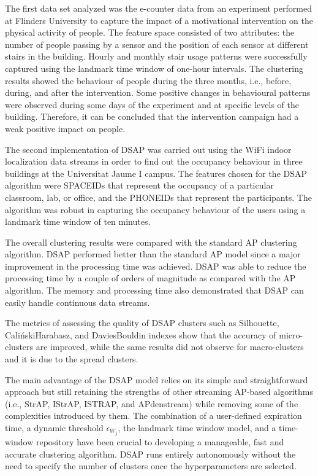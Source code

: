 The first data set analyzed was the e-counter data from an experiment performed at Flinders University to capture the impact of a motivational intervention on the physical activity of people. The feature space consisted of two attributes: the number of people passing by a sensor and the position of each sensor at different stairs in the building. Hourly and monthly stair usage patterns were successfully captured using the landmark time window of one-hour intervals. The clustering results showed the behaviour of people during the three months, i.e., before, during, and after the intervention. Some positive changes in behavioural patterns were observed during some days of the experiment and at specific levels of the building. Therefore, it can be concluded that the intervention campaign had a weak positive impact on people.

The second implementation of DSAP was carried out using the WiFi indoor localization data streams in order to find out the occupancy behaviour in three buildings at the Universitat Jaume I campus. The features chosen for the DSAP algorithm were SPACEIDs that represent the occupancy of a particular classroom, lab, or office, and the PHONEIDs that represent the participants. The algorithm was robust in capturing the occupancy behaviour of the users using a landmark time window of ten minutes. 
 
The overall clustering results were compared with the standard AP clustering algorithm. DSAP performed better than the standard AP model since a major improvement in the processing time was achieved. DSAP was able to reduce the processing time by a couple of orders of magnitude as compared with the AP algorithm. The memory and processing time also demonstrated that DSAP can easily handle continuous data streams.

The metrics of assessing the quality of DSAP clusters such as Silhouette, Caliński\-Harabasz, and Davies\-Bouldin indexes show that the accuracy of micro-clusters are improved, while the same results did not observe for macro-clusters and it is due to the spread clusters.

The main advantage of the DSAP model relies on its simple and straightforward approach but still retaining the strengths of other streaming AP-based algorithms (i.e., StrAP, IStrAP, ISTRAP, and APdenstream) while removing some of the complexities introduced by them. The combination of a user-defined expiration time, a dynamic threshold $\epsilon_{W_j}$, the landmark time window model, and a time-window repository have been crucial to developing a manageable, fast and accurate clustering algorithm. DSAP runs entirely autonomously without the need to specify the number of clusters once the hyperparameters are selected. 


